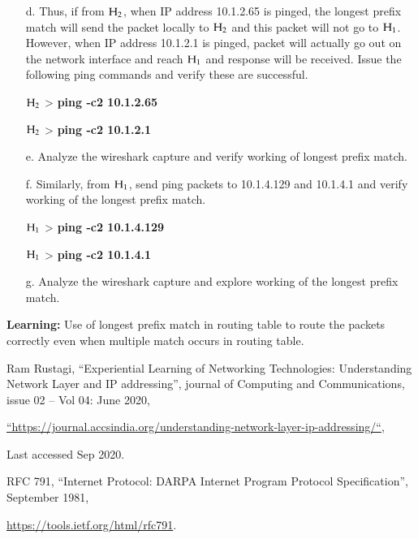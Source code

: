 \begin{multicols}{2}
\begin{itemize}
\item[d.] Thus, if from ${\rm H}_{2}$, when IP address 10.1.2.65 is pinged, the longest prefix match will send the packet locally to ${\rm H}_{2}$ and this packet will not go to ${\rm H}_{1}$. However, when IP address 10.1.2.1 is pinged, packet will actually go out on the network interface and reach ${\rm H}_{1}$ and response will be received. Issue the following ping commands and verify these are successful.

${\rm H}_{2}$ > \textbf{ping -c2 10.1.2.65}

${\rm H}_{2}$ > \textbf{ping -c2 10.1.2.1}

\item[e.] Analyze the wireshark capture and verify working of longest prefix match.

\item[f.] Similarly, from ${\rm H}_{1}$, send ping packets to 10.1.4.129 and 10.1.4.1 and verify working of the longest prefix match.

${\rm H}_{1}$ > \textbf{ping -c2 10.1.4.129}

${\rm H}_{1}$ > \textbf{ping -c2 10.1.4.1}

\item[g.] Analyze the wireshark capture and explore working of the longest prefix match.
\end{itemize}

\textbf{Learning:} Use of longest prefix match in routing table to route the packets correctly even when multiple match occurs in routing table.

\begin{thebibliography}{99}

 Ram Rustagi, “Experiential Learning of Networking Technologies: Understanding Network Layer and IP addressing”, journal of Computing and Communications, issue 02 – Vol 04: June 2020,

\url{“https://journal.accsindia.org/understanding-network-layer-ip-addressing/“},

Last accessed Sep 2020.

 RFC 791, “Internet Protocol: DARPA Internet Program Protocol Specification”, September 1981,

\url{ https://tools.ietf.org/html/rfc791}.


\end{thebibliography}
\end{multicols}
